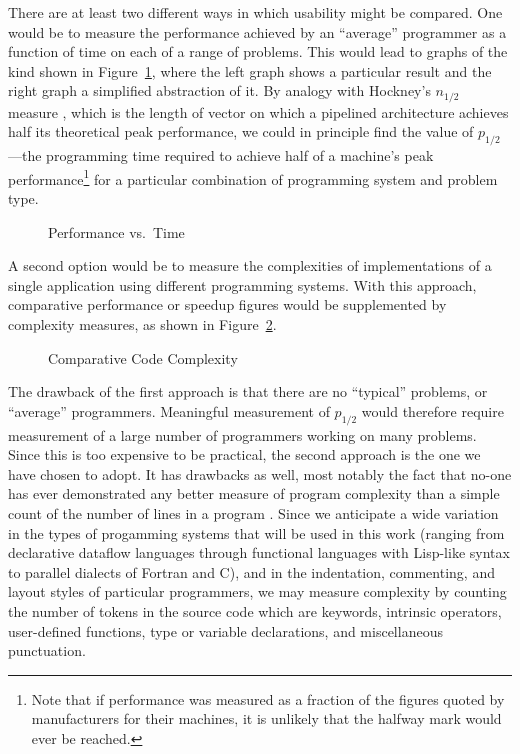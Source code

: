 There are at least two different ways in which usability might be compared.
One would be to measure the performance achieved by an ``average'' programmer
as a function of time on each of a range of problems.
This would lead to graphs of the kind shown in Figure~\ref{f:perf},
where the left graph shows a particular result
and the right graph a simplified abstraction of it.
By analogy with Hockney's $n_{1/2}$ measure \cite{b:hockney-perfparam},
which is the length of vector on which a pipelined architecture achieves
half its theoretical peak performance,
we could in principle find the value of $p_{1/2}$---the programming time required to achieve
half of a machine's peak performance\footnote{Note that
	if performance was measured as a fraction of the figures quoted by manufacturers for their machines,
	it is unlikely that the halfway mark would ever be reached.}
for a particular combination of programming system and problem type.

\begin{figure}
\epsfxsize=12cm
\begin{center}\mbox{}\end{center}
\caption{Performance vs.\ Time\label{f:perf}}
\end{figure}

A second option would be to measure the complexities of
implementations of a single application using different programming systems.
With this approach,
comparative performance or speedup figures would be supplemented by complexity measures,
as shown in Figure~\ref{f:complex}.

\begin{figure}
\epsfxsize=6cm
\begin{center}\mbox{}\end{center}
\caption{Comparative Code Complexity\label{f:complex}}
\end{figure}

The drawback of the first approach is that there are no ``typical'' problems,
or ``average'' programmers.
Meaningful measurement of  $p_{1/2}$ would therefore require
measurement of a large number of programmers working on many problems.
Since this is too expensive to be practical,
the second approach is the one we have chosen to adopt.
It has drawbacks as well,
most notably the fact that no-one has ever demonstrated any better measure of program complexity
than a simple count of the number of lines in a program \cite{b:fenton-metrics}.
Since we anticipate a wide variation in the types of progamming systems that will be used in this work
(ranging from declarative dataflow languages
through functional languages with Lisp-like syntax
to parallel dialects of Fortran and C),
and in the indentation, commenting, and layout styles of particular programmers,
we may measure complexity by counting the number of tokens in the source code which are
keywords,
intrinsic operators,
user-defined functions,
type or variable declarations,
and miscellaneous punctuation.

